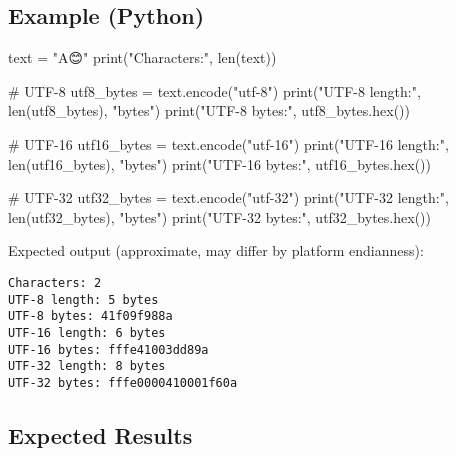 \documentclass[
  letterpaper,
  DIV=11,
  numbers=noendperiod]{scrreprt}
\newenvironment{Shaded}{\begin{snugshade}}{\end{snugshade}}
\newcommand{\BuiltInTok}[1]{\textcolor[rgb]{0.00,0.23,0.31}{#1}}
\newcommand{\CommentTok}[1]{\textcolor[rgb]{0.37,0.37,0.37}{#1}}
\newcommand{\NormalTok}[1]{\textcolor[rgb]{0.00,0.23,0.31}{#1}}
\newcommand{\OperatorTok}[1]{\textcolor[rgb]{0.37,0.37,0.37}{#1}}
\newcommand{\StringTok}[1]{\textcolor[rgb]{0.13,0.47,0.30}{#1}}
\begin{document}
\subsection{Example (Python)}\label{example-python}

\begin{Shaded}
\begin{Highlighting}[]
\NormalTok{text }\OperatorTok{=} \StringTok{"A😊"}
\BuiltInTok{print}\NormalTok{(}\StringTok{"Characters:"}\NormalTok{, }\BuiltInTok{len}\NormalTok{(text))}

\CommentTok{\# UTF{-}8}
\NormalTok{utf8\_bytes }\OperatorTok{=}\NormalTok{ text.encode(}\StringTok{"utf{-}8"}\NormalTok{)}
\BuiltInTok{print}\NormalTok{(}\StringTok{"UTF{-}8 length:"}\NormalTok{, }\BuiltInTok{len}\NormalTok{(utf8\_bytes), }\StringTok{"bytes"}\NormalTok{)}
\BuiltInTok{print}\NormalTok{(}\StringTok{"UTF{-}8 bytes:"}\NormalTok{, utf8\_bytes.}\BuiltInTok{hex}\NormalTok{())}

\CommentTok{\# UTF{-}16}
\NormalTok{utf16\_bytes }\OperatorTok{=}\NormalTok{ text.encode(}\StringTok{"utf{-}16"}\NormalTok{)}
\BuiltInTok{print}\NormalTok{(}\StringTok{"UTF{-}16 length:"}\NormalTok{, }\BuiltInTok{len}\NormalTok{(utf16\_bytes), }\StringTok{"bytes"}\NormalTok{)}
\BuiltInTok{print}\NormalTok{(}\StringTok{"UTF{-}16 bytes:"}\NormalTok{, utf16\_bytes.}\BuiltInTok{hex}\NormalTok{())}

\CommentTok{\# UTF{-}32}
\NormalTok{utf32\_bytes }\OperatorTok{=}\NormalTok{ text.encode(}\StringTok{"utf{-}32"}\NormalTok{)}
\BuiltInTok{print}\NormalTok{(}\StringTok{"UTF{-}32 length:"}\NormalTok{, }\BuiltInTok{len}\NormalTok{(utf32\_bytes), }\StringTok{"bytes"}\NormalTok{)}
\BuiltInTok{print}\NormalTok{(}\StringTok{"UTF{-}32 bytes:"}\NormalTok{, utf32\_bytes.}\BuiltInTok{hex}\NormalTok{())}
\end{Highlighting}
\end{Shaded}

Expected output (approximate, may differ by platform endianness):

\begin{verbatim}
Characters: 2
UTF-8 length: 5 bytes
UTF-8 bytes: 41f09f988a
UTF-16 length: 6 bytes
UTF-16 bytes: fffe41003dd89a
UTF-32 length: 8 bytes
UTF-32 bytes: fffe0000410001f60a
\end{verbatim}

\subsection{Expected Results}\label{expected-results}
\end{document}
